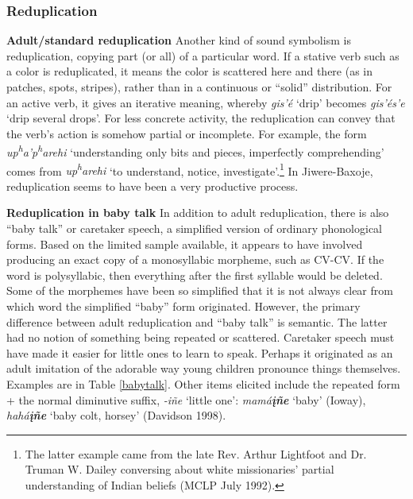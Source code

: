 \documentclass[output=paper]{LSP/langsci}
\begin{document}
\subsubsection{Reduplication}		
											
\textbf{Adult/standard reduplication}	Another kind of sound symbolism is reduplication, copying part (or all) of a particular word. If a stative verb such as a color is reduplicated, it means the color is scattered here and there (as in patches, spots, stripes), rather than in a continuous or ``solid'' distribution.  For an active verb, it gives an iterative meaning, whereby \textit{gis'\'e} `drip' becomes \textit{gis'\'es'e} `drip several drops'.  For less concrete activity, the reduplication can convey that the verb's action is somehow partial or incomplete.  For example, the form \textit{up\textsuperscript{h}a'p\textsuperscript{h}arehi} `understanding only bits and pieces, imperfectly comprehending' comes from \textit{up\textsuperscript{h}arehi} `to understand, notice, investigate'.\footnote{The latter example came from the late Rev. Arthur Lightfoot and Dr. Truman W. Dailey conversing about white missionaries' partial understanding of Indian beliefs (MCLP July 1992).}  In Jiwere-Baxoje, reduplication seems to have been a very productive process.	

\vspace{1em}														
\textbf{Reduplication in baby talk} In addition to adult reduplication, there is also ``baby talk'' or caretaker speech, a simplified version of ordinary phonological forms. Based on the limited sample available, it appears to have involved producing an exact copy of a monosyllabic morpheme, such as CV-CV.  If the word is polysyllabic, then everything after the first syllable would be deleted.  Some of the morphemes have been so simplified that it is not always clear from which word the simplified ``baby'' form originated. However, the primary difference between adult reduplication and ``baby talk'' is semantic.  The latter had no notion of something being repeated or scattered. Caretaker speech must have made it easier for little ones to learn to speak. Perhaps it originated as an adult imitation of the adorable way young children pronounce things themselves. Examples are in Table \ref{babytalk}. 	Other items elicited include the repeated form + the normal diminutive suffix, \textit{-i\~ne} `little one':  \textit{mam\'a\textbf{\k{i}\~ne}} `baby' (Ioway), \textit{hah\'a\textbf{\k{i}\~ne}} `baby colt, horsey' (Davidson 1998).
\end{document}

